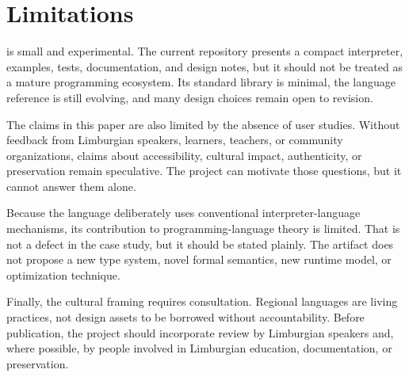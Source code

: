 \section{Limitations}

\plat{} is small and experimental. The current repository presents a compact
interpreter, examples, tests, documentation, and design notes, but it should
not be treated as a mature programming ecosystem. Its standard library is
minimal, the language reference is still evolving, and many design choices
remain open to revision.

The claims in this paper are also limited by the absence of user studies.
Without feedback from Limburgian speakers, learners, teachers, or community
organizations, claims about accessibility, cultural impact, authenticity, or
preservation remain speculative. The project can motivate those questions, but
it cannot answer them alone.

Because the language deliberately uses conventional interpreter-language
mechanisms, its contribution to programming-language theory is limited. That is
not a defect in the case study, but it should be stated plainly. The artifact
does not propose a new type system, novel formal semantics, new runtime model,
or optimization technique.

Finally, the cultural framing requires consultation. Regional languages are
living practices, not design assets to be borrowed without accountability.
Before publication, the project should incorporate review by Limburgian
speakers and, where possible, by people involved in Limburgian education,
documentation, or preservation.

